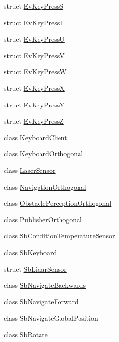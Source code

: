 \begin{DoxyCompactItemize}
\item 
struct \hyperlink{structsm__dance__bot_1_1EvKeyPressS}{Ev\+Key\+PressS}
\item 
struct \hyperlink{structsm__dance__bot_1_1EvKeyPressT}{Ev\+Key\+PressT}
\item 
struct \hyperlink{structsm__dance__bot_1_1EvKeyPressU}{Ev\+Key\+PressU}
\item 
struct \hyperlink{structsm__dance__bot_1_1EvKeyPressV}{Ev\+Key\+PressV}
\item 
struct \hyperlink{structsm__dance__bot_1_1EvKeyPressW}{Ev\+Key\+PressW}
\item 
struct \hyperlink{structsm__dance__bot_1_1EvKeyPressX}{Ev\+Key\+PressX}
\item 
struct \hyperlink{structsm__dance__bot_1_1EvKeyPressY}{Ev\+Key\+PressY}
\item 
struct \hyperlink{structsm__dance__bot_1_1EvKeyPressZ}{Ev\+Key\+PressZ}
\item 
class \hyperlink{classsm__dance__bot_1_1KeyboardClient}{Keyboard\+Client}
\item 
class \hyperlink{classsm__dance__bot_1_1KeyboardOrthogonal}{Keyboard\+Orthogonal}
\item 
class \hyperlink{classsm__dance__bot_1_1LaserSensor}{Laser\+Sensor}
\item 
class \hyperlink{classsm__dance__bot_1_1NavigationOrthogonal}{Navigation\+Orthogonal}
\item 
class \hyperlink{classsm__dance__bot_1_1ObstaclePerceptionOrthogonal}{Obstacle\+Perception\+Orthogonal}
\item 
class \hyperlink{classsm__dance__bot_1_1PublisherOrthogonal}{Publisher\+Orthogonal}
\item 
class \hyperlink{classsm__dance__bot_1_1SbConditionTemperatureSensor}{Sb\+Condition\+Temperature\+Sensor}
\item 
class \hyperlink{classsm__dance__bot_1_1SbKeyboard}{Sb\+Keyboard}
\item 
struct \hyperlink{structsm__dance__bot_1_1SbLidarSensor}{Sb\+Lidar\+Sensor}
\item 
class \hyperlink{classsm__dance__bot_1_1SbNavigateBackwards}{Sb\+Navigate\+Backwards}
\item 
class \hyperlink{classsm__dance__bot_1_1SbNavigateForward}{Sb\+Navigate\+Forward}
\item 
class \hyperlink{classsm__dance__bot_1_1SbNavigateGlobalPosition}{Sb\+Navigate\+Global\+Position}
\item 
class \hyperlink{classsm__dance__bot_1_1SbRotate}{Sb\+Rotate}

\end{DoxyCompactItemize}
